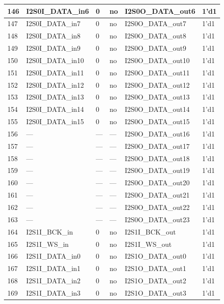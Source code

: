 \begin{longtable}[c]{|p{1cm}|p{3.3cm}|p{1.5cm}|p{2.4cm}|p{4.3cm}|p{2.5cm}| }
    146 & I2S0I\_DATA\_in6 & 0 & no & I2S0O\_DATA\_out6 & 1'd1 \\ \hline
    147 & I2S0I\_DATA\_in7 & 0 & no & I2S0O\_DATA\_out7 & 1'd1 \\ \hline
    148 & I2S0I\_DATA\_in8 & 0 & no & I2S0O\_DATA\_out8 & 1'd1 \\ \hline
    149 & I2S0I\_DATA\_in9 & 0 & no & I2S0O\_DATA\_out9 & 1'd1 \\ \hline
    150 & I2S0I\_DATA\_in10 & 0 & no & I2S0O\_DATA\_out10 & 1'd1 \\ \hline
    151 & I2S0I\_DATA\_in11 & 0 & no & I2S0O\_DATA\_out11 & 1'd1 \\ \hline
    152 & I2S0I\_DATA\_in12 & 0 & no & I2S0O\_DATA\_out12 & 1'd1 \\ \hline
    153 & I2S0I\_DATA\_in13 & 0 & no & I2S0O\_DATA\_out13 & 1'd1 \\ \hline
    154 & I2S0I\_DATA\_in14 & 0 & no & I2S0O\_DATA\_out14 & 1'd1 \\ \hline
    155 & I2S0I\_DATA\_in15 & 0 & no & I2S0O\_DATA\_out15 & 1'd1 \\ \hline
    156 & --- & --- & --- & I2S0O\_DATA\_out16 & 1'd1 \\ \hline
    157 & --- & --- & --- & I2S0O\_DATA\_out17 & 1'd1 \\ \hline
    158 & --- & --- & --- & I2S0O\_DATA\_out18 & 1'd1 \\ \hline
    159 & --- & --- & --- & I2S0O\_DATA\_out19 & 1'd1 \\ \hline
    160 & --- & --- & --- & I2S0O\_DATA\_out20 & 1'd1 \\ \hline
    161 & --- & --- & --- & I2S0O\_DATA\_out21 & 1'd1 \\ \hline
    162 & --- & --- & --- & I2S0O\_DATA\_out22 & 1'd1 \\ \hline
    163 & --- & --- & --- & I2S0O\_DATA\_out23 & 1'd1 \\ \hline
    164 & I2S1I\_BCK\_in & 0 & no & I2S1I\_BCK\_out & 1'd1 \\ \hline
    165 & I2S1I\_WS\_in & 0 & no & I2S1I\_WS\_out & 1'd1 \\ \hline
    166 & I2S1I\_DATA\_in0 & 0 & no & I2S1O\_DATA\_out0 & 1'd1 \\ \hline
    167 & I2S1I\_DATA\_in1 & 0 & no & I2S1O\_DATA\_out1 & 1'd1 \\ \hline
    168 & I2S1I\_DATA\_in2 & 0 & no & I2S1O\_DATA\_out2 & 1'd1 \\ \hline
    169 & I2S1I\_DATA\_in3 & 0 & no & I2S1O\_DATA\_out3 & 1'd1 \\ \hline

\end{longtable}
